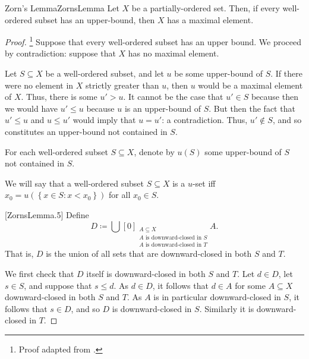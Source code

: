 \begin{thm}{Zorn's Lemma}{ZornsLemma}
Let $X$ be a partially-ordered set.  Then, if every well-ordered subset has an upper-bound, then $X$ has a maximal element.
\begin{proof}\footnote{Proof adapted from \cite{Grayson}.}
Suppose that every well-ordered subset has an upper bound.  We proceed by contradiction:  suppose that $X$ has no maximal element.

Let $S\subseteq X$ be a well-ordered subset, and let $u$ be some upper-bound of $S$.  If there were no element in $X$ strictly greater than $u$, then $u$ would be a maximal element of $X$.  Thus, there is some $u'>u$.  It cannot be the case that $u'\in S$ because then we would have $u'\leq u$ because $u$ is an upper-bound of $S$.  But then the fact that $u'\leq u$ and $u\leq u'$ would imply that $u=u'$:  a contradiction.  Thus, $u'\notin S$, and so constitutes an upper-bound not contained in $S$.

For each well-ordered subset $S\subseteq X$, denote by $u(S)$ some upper-bound of $S$ not contained in $S$.

We will say that a well-ordered subset $S\subseteq X$ is a $u$-set iff $x_0=u\left( \left\{ x\in S:x<x_0\right\} \right)$ for all $x_0\in S$.

[ZornsLemma.5]
Define
\begin{equation}
D\coloneqq \bigcup[0]_{\substack{A\subseteq X \\ A\text{ is downward-closed in }S \\ A\text{ is downward-closed in }T}}A.
\end{equation}
That is, $D$ is the union of all sets that are downward-closed in both $S$ and $T$.

We first check that $D$ itself is downward-closed in both $S$ and $T$.  Let $d\in D$, let $s\in S$, and suppose that $s\leq d$.  As $d\in D$, it follows that $d\in A$ for some $A\subseteq X$ downward-closed in both $S$ and $T$.  As $A$ is in particular downward-closed in $S$, it follows that $s\in D$, and so $D$ is downward-closed in $S$.  Similarly it is downward-closed in $T$.


\end{proof}
\end{thm}
